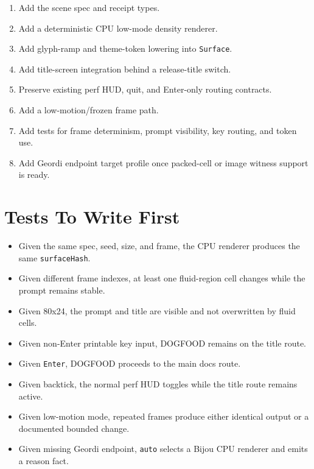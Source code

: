 \begin{enumerate}
\def\labelenumi{\arabic{enumi}.}
\tightlist
\item
  Add the scene spec and receipt types.
\item
  Add a deterministic CPU low-mode density renderer.
\item
  Add glyph-ramp and theme-token lowering into \texttt{S\allowbreak{}u\allowbreak{}r\allowbreak{}f\allowbreak{}a\allowbreak{}c\allowbreak{}e}.
\item
  Add title-screen integration behind a release-title switch.
\item
  Preserve existing perf HUD, quit, and Enter-only routing contracts.
\item
  Add a low-motion/frozen frame path.
\item
  Add tests for frame determinism, prompt visibility, key routing, and token use.
\item
  Add Geordi endpoint target profile once packed-cell or image witness support is ready.
\end{enumerate}

\section{Tests To Write First}\label{record-114-tests-to-write-first}

\begin{itemize}
\tightlist
\item
  Given the same spec, seed, size, and frame, the CPU renderer produces the same \texttt{s\allowbreak{}u\allowbreak{}r\allowbreak{}f\allowbreak{}a\allowbreak{}c\allowbreak{}e\allowbreak{}H\allowbreak{}a\allowbreak{}s\allowbreak{}h}.
\item
  Given different frame indexes, at least one fluid-region cell changes while the prompt remains stable.
\item
  Given 80x24, the prompt and title are visible and not overwritten by fluid cells.
\item
  Given non-Enter printable key input, DOGFOOD remains on the title route.
\item
  Given \texttt{E\allowbreak{}n\allowbreak{}t\allowbreak{}e\allowbreak{}r}, DOGFOOD proceeds to the main docs route.
\item
  Given backtick, the normal perf HUD toggles while the title route remains active.
\item
  Given low-motion mode, repeated frames produce either identical output or a documented bounded change.
\item
  Given missing Geordi endpoint, \texttt{a\allowbreak{}u\allowbreak{}t\allowbreak{}o} selects a Bijou CPU renderer and emits a reason fact.
\end{itemize}

